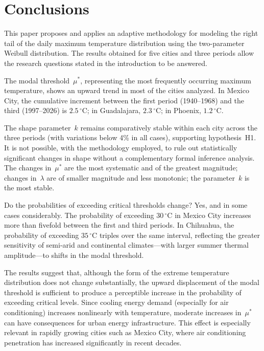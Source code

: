 \documentclass[APA,STIX1COL]{WileyNJD-v2}
\begin{document}
\section{Conclusions}\label{sec:conclusions}

This paper proposes and applies an adaptive methodology for
modeling the right tail of the daily maximum temperature
distribution using the two-parameter Weibull distribution. The
results obtained for five cities and three periods allow the
research questions stated in the introduction to be answered.

The modal threshold~$\mu^*$, representing the most frequently
occurring maximum temperature, shows an upward trend in most of
the cities analyzed. In Mexico City, the cumulative increment
between the first period (1940--1968) and the third (1997--2026)
is $2.5\,{}^\circ\mathrm{C}$; in Guadalajara,
$2.3\,{}^\circ\mathrm{C}$; in Phoenix,
$1.2\,{}^\circ\mathrm{C}$.

The shape parameter~$k$ remains comparatively stable within each
city across the three periods (with variations below 4\% in all
cases), supporting hypothesis~H1. It is not possible, with the
methodology employed, to rule out statistically significant
changes in shape without a complementary formal inference
analysis. The changes in~$\mu^*$ are the most systematic and of
the greatest magnitude; changes in~$\lambda$ are of smaller
magnitude and less monotonic; the parameter~$k$ is the most
stable.

Do the probabilities of exceeding critical thresholds change?
Yes, and in some cases considerably. The probability of exceeding
$30\,{}^\circ\mathrm{C}$ in Mexico City increases more than
fivefold between the first and third periods. In Chihuahua, the
probability of exceeding $35\,{}^\circ\mathrm{C}$ triples over
the same interval, reflecting the greater sensitivity of
semi-arid and continental climates---with larger summer thermal
amplitude---to shifts in the modal threshold.

The results suggest that, although the form of the extreme
temperature distribution does not change substantially, the
upward displacement of the modal threshold is sufficient to
produce a perceptible increase in the probability of exceeding
critical levels. Since cooling energy demand (especially for
air conditioning) increases nonlinearly with temperature, moderate
increases in~$\mu^*$ can have consequences for urban energy
infrastructure. This effect is especially relevant in rapidly
growing cities such as Mexico City, where air conditioning
penetration has increased significantly in recent decades.


\end{document}
